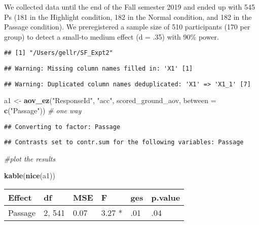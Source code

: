 \documentclass[]{article}
\newenvironment{Shaded}{\begin{snugshade}}{\end{snugshade}}
\newcommand{\CommentTok}[1]{\textcolor[rgb]{0.56,0.35,0.01}{\textit{#1}}}
\newcommand{\DataTypeTok}[1]{\textcolor[rgb]{0.13,0.29,0.53}{#1}}
\newcommand{\KeywordTok}[1]{\textcolor[rgb]{0.13,0.29,0.53}{\textbf{#1}}}
\newcommand{\NormalTok}[1]{#1}
\newcommand{\StringTok}[1]{\textcolor[rgb]{0.31,0.60,0.02}{#1}}
\begin{document}
We collected data until the end of the Fall semester 2019 and ended up
with 545 Ps (181 in the Highlight condition, 182 in the Normal
condition, and 182 in the Passage condition). We preregistered a sample
size of 510 participants (170 per group) to detect a small-to medium
effect (d = .35) with 90\% power.

\begin{verbatim}
## [1] "/Users/gellr/SF_Expt2"
\end{verbatim}

\begin{verbatim}
## Warning: Missing column names filled in: 'X1' [1]
\end{verbatim}

\begin{verbatim}
## Warning: Duplicated column names deduplicated: 'X1' => 'X1_1' [7]
\end{verbatim}

\begin{Shaded}
\begin{Highlighting}[]
\NormalTok{a1 <-}\StringTok{ }\KeywordTok{aov_ez}\NormalTok{(}\StringTok{"ResponseId"}\NormalTok{, }\StringTok{"acc"}\NormalTok{, scored_ground_aov, }
             \DataTypeTok{between =} \KeywordTok{c}\NormalTok{(}\StringTok{"Passage"}\NormalTok{)) }\CommentTok{# one way}
\end{Highlighting}
\end{Shaded}

\begin{verbatim}
## Converting to factor: Passage
\end{verbatim}

\begin{verbatim}
## Contrasts set to contr.sum for the following variables: Passage
\end{verbatim}

\begin{Shaded}
\begin{Highlighting}[]
\CommentTok{#plot the results}

\KeywordTok{kable}\NormalTok{(}\KeywordTok{nice}\NormalTok{(a1))}
\end{Highlighting}
\end{Shaded}

\begin{longtable}[]{@{}llllll@{}}
\toprule
Effect & df & MSE & F & ges & p.value\tabularnewline
\midrule
\endhead
Passage & 2, 541 & 0.07 & 3.27 * & .01 & .04\tabularnewline
\bottomrule
\end{longtable}
\end{document}

